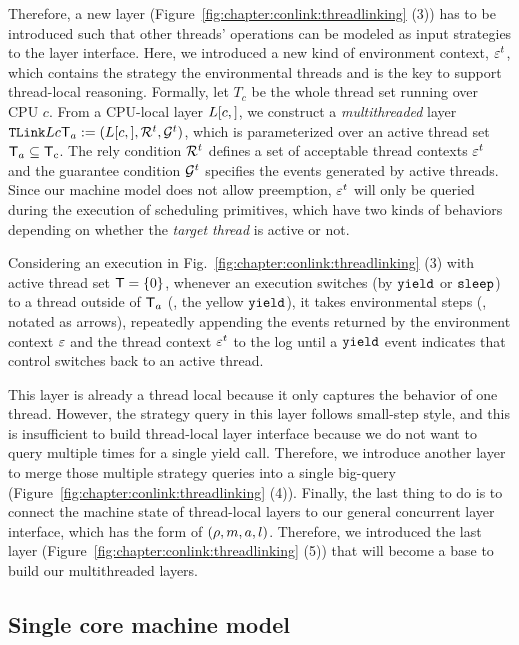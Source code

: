 Therefore,  a new layer (\cf Figure~\ref{fig:chapter:conlink:threadlinking} (3)) has to be introduced such that other 
threads' operations can be modeled as input strategies to the layer interface. 
Here, we introduced a new kind of environment context, ${\varepsilon}^{t}$, which contains the strategy the environmental threads and is the key to support  thread-local reasoning.
Formally, let $T_c$ be the whole thread set running over CPU $c$.
From a CPU-local layer  $L[c, ]$,  we construct a 
 \emph{multithreaded} layer ${{\mathrm{\texttt{TLink}}}}{L}{c}{\mathsf{T}_a} := (L[c, ],
 \mathcal{R}^t, \mathcal{G}^t)$,
which is 
parameterized over an active thread set $\mathsf{T}_a \subseteq \mathsf{T}_{\mathrm{c}}$.
The rely condition $\mathcal{R}^t$ defines a set of acceptable thread contexts
${\varepsilon}^t$ and the guarantee condition $\mathcal{G}^t$ specifies the events generated by active threads. 
Since our machine model does not allow
preemption, ${\varepsilon}^t$ will only be queried during the execution of scheduling primitives, 
which have two kinds
of behaviors  depending on whether the \emph{target
thread} is active or not.

Considering an execution in Fig.~\ref{fig:chapter:conlink:threadlinking} (3) with active thread set
$\mathsf{T} = \{0\}$, whenever an execution switches (by ${\mathrm{\texttt{yield}}}$ or ${\mathrm{\texttt{sleep}}}$) 
to a thread outside of $\mathsf{T}_a$ (\ie, the yellow ${\mathrm{\texttt{yield}}}$),
it takes environmental steps (\ie, notated as arrows), repeatedly appending the 
events returned by the environment context ${\varepsilon}$ and the thread
context ${\varepsilon}^t$ to the log until a ${\mathrm{\texttt{yield}}}$
event indicates that control switches back to an active thread.


This layer is already a thread local because it only captures the behavior of one thread.
However, the strategy query in this layer follows small-step style, and this is insufficient to build thread-local layer interface because we do not want to query multiple times for a single yield call. 
Therefore, we introduce another  layer to merge those multiple strategy queries into a single big-query (\cf Figure~\ref{fig:chapter:conlink:threadlinking} (4)). 
Finally, the last thing to do is to connect the machine state of thread-local layers to our general concurrent layer interface, which has the form of $(\rho, m, a, l)$.
Therefore, we introduced the last layer (Figure~\ref{fig:chapter:conlink:threadlinking} (5)) that will become a base to build our multithreaded layers.

\subsection{Single core machine model}
\label{chapter:linking:subsec:cpu-local-layer-interface}

